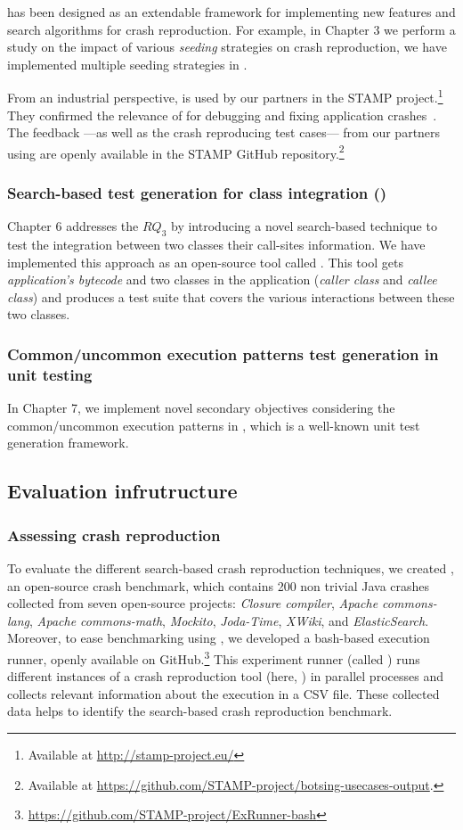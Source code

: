 \botsing has been designed as an extendable framework for implementing new features and search algorithms for crash reproduction. For example, in Chapter 3 we perform a study on the impact of various \emph{seeding} strategies on crash reproduction, we have implemented multiple seeding strategies in \botsing.

From an industrial perspective, \botsing is used by our partners in the STAMP project.\footnote{Available at \url{http://stamp-project.eu/}}
They confirmed the relevance of \botsing for debugging and fixing application crashes~\cite{D57}.
The feedback ---as well as the crash reproducing test cases--- from our partners using \botsing are openly available in the STAMP GitHub repository.\footnote{Available at \url{https://github.com/STAMP-project/botsing-usecases-output}.}

\subsubsection{Search-based test generation for class integration (\cling)}
Chapter 6 addresses the $RQ_3$ by introducing a novel search-based technique to test the integration between two classes their call-sites information. We have implemented this approach as an open-source tool called \cling. This tool gets \emph{application's bytecode} and two classes in the application (\emph{caller class} and \emph{callee class}) and produces a test suite that covers the various interactions between these two classes.

\subsubsection{Common/uncommon execution patterns test generation in unit testing}
In Chapter 7, we implement novel secondary objectives considering the common/uncommon execution patterns in \evosuite, which is a well-known unit test generation framework.

\subsection{Evaluation infrutructure}

\subsubsection{Assessing crash reproduction}
To evaluate the different search-based crash reproduction techniques, we created \jcrashpack, an open-source crash benchmark, which contains 200 non trivial Java crashes collected from seven open-source projects: \textit{Closure compiler}, \textit{Apache commons-lang}, \textit{Apache commons-math}, \textit{Mockito}, \textit{Joda-Time}, \textit{XWiki}, and \textit{ElasticSearch}.
Moreover, to ease benchmarking using \crashpack, we developed a bash-based execution runner, openly available on GitHub.\footnote{\url{https://github.com/STAMP-project/ExRunner-bash}} This experiment runner (called \exrunner) runs different instances of a crash reproduction tool (here, \botsing) in parallel processes and collects relevant information about the execution in a CSV file. These collected data helps to identify the search-based crash reproduction benchmark.

